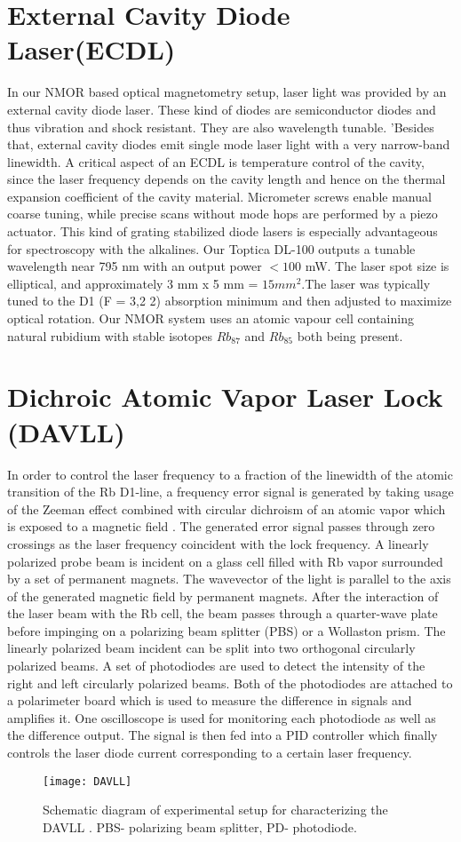 \documentclass[12pt]{report}
\begin{document}
\section{External Cavity Diode Laser(ECDL)}
\bigskip
In our NMOR based optical magnetometry setup, laser light was provided by an external cavity diode laser. These kind of diodes are semiconductor diodes and thus vibration and shock resistant. They are also wavelength tunable. ’Besides that, external cavity diodes emit single mode laser light with a very narrow-band linewidth. A critical aspect of an ECDL is temperature control of the cavity, since the laser frequency depends on the cavity length and hence on the thermal expansion coefficient of the cavity material. Micrometer screws enable manual coarse tuning, while precise scans without mode hops are performed by a piezo actuator. This kind of grating stabilized diode lasers is especially advantageous for spectroscopy with the alkalines. Our Toptica DL-100 outputs a tunable wavelength near 795 nm with an output power $<100$ mW. The laser spot size is elliptical, and approximately 3 mm x 5 mm = $15 mm^2$.The laser was typically tuned to the D1 (F = 3,2 2) absorption minimum and then adjusted to maximize optical rotation. Our NMOR system uses an atomic vapour cell containing natural rubidium with stable isotopes $Rb_{87}$ and $Rb_{85}$ both being present.

\section{Dichroic Atomic Vapor Laser Lock (DAVLL)}
\medskip
In order to control the laser frequency to a fraction of the linewidth of the atomic transition of the Rb D1-line, a frequency error signal is generated by taking usage of the Zeeman effect combined with circular dichroism of an atomic vapor which is exposed to a magnetic field \cite{doi:10.1063/1.3568824}. The generated error signal passes through zero crossings as the laser frequency coincident with the lock frequency. A linearly polarized probe beam is incident on a glass cell filled with Rb vapor surrounded by a set of permanent magnets. The wavevector of the light is parallel to the axis of the generated magnetic field by permanent magnets. After the interaction of the laser beam with the Rb cell, the beam passes through a quarter-wave plate before impinging on a polarizing beam splitter (PBS) or a Wollaston prism. The linearly polarized beam incident can be split into two orthogonal circularly polarized beams. A set of photodiodes are used to detect the intensity of the right and left circularly polarized beams. Both of the photodiodes are attached to a polarimeter board which is used to measure the difference in signals and amplifies it. One oscilloscope is used for monitoring each photodiode as well as the difference output. The signal is then fed into a PID controller which finally controls the laser diode current corresponding to a certain laser frequency.
\begin{figure}[h]
\centering
\texttt{[image: DAVLL]}
\caption{Schematic diagram of experimental setup for characterizing the DAVLL . PBS- polarizing beam splitter, PD- photodiode.}
\end{figure}
\end{document}
